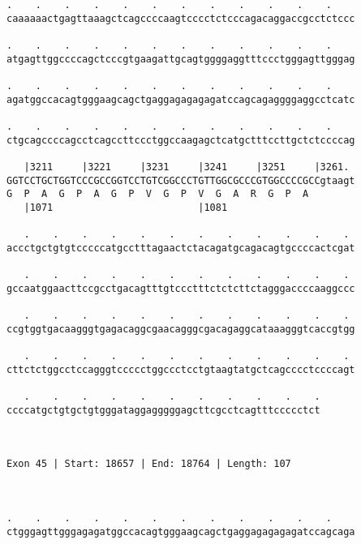 \documentclass{article}
\begin{document}
\begin{Verbatim}
.    .    .    .    .    .    .    .    .    .    .    .    
caaaaaactgagttaaagctcagccccaagtcccctctcccagacaggaccgcctctccc
                                                            
.    .    .    .    .    .    .    .    .    .    .    .    
atgagttggccccagctcccgtgaagattgcagtggggaggtttccctgggagttgggag
                                                            
.    .    .    .    .    .    .    .    .    .    .    .    
agatggccacagtgggaagcagctgaggagagagagatccagcagaggggaggcctcatc
                                                            
.    .    .    .    .    .    .    .    .    .    .    .    
ctgcagccccagcctcagccttccctggccaagagctcatgctttccttgctctccccag
                                                            
   |3211     |3221     |3231     |3241     |3251     |3261. 
GGTCCTGCTGGTCCCGCCGGTCCTGTCGGCCCTGTTGGCGCCCGTGGCCCCGCCgtaagt
G  P  A  G  P  A  G  P  V  G  P  V  G  A  R  G  P  A        
   |1071                         |1081                      
  
   .    .    .    .    .    .    .    .    .    .    .    . 
accctgctgtgtcccccatgcctttagaactctacagatgcagacagtgccccactcgat
                                                            
   .    .    .    .    .    .    .    .    .    .    .    . 
gccaatggaacttccgcctgacagtttgtccctttctctcttctagggaccccaaggccc
                                                            
   .    .    .    .    .    .    .    .    .    .    .    . 
ccgtggtgacaagggtgagacaggcgaacagggcgacagaggcataaagggtcaccgtgg
                                                            
   .    .    .    .    .    .    .    .    .    .    .    . 
cttctctggcctccagggtccccctggccctcctgtaagtatgctcagcccctccccagt
                                                            
   .    .    .    .    .    .    .    .    .    .    .
ccccatgctgtgctgtgggataggagggggagcttcgcctcagtttccccctct
                                                      
                                                      
 
Exon 45 | Start: 18657 | End: 18764 | Length: 107



.    .    .    .    .    .    .    .    .    .    .    .    
ctgggagttgggagagatggccacagtgggaagcagctgaggagagagagatccagcaga
                                                            

\end{Verbatim}
\end{document}
